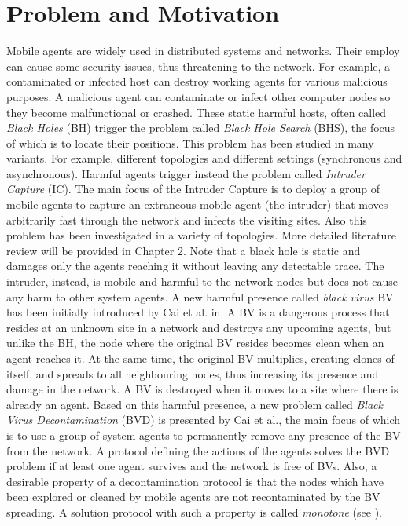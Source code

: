 \section{Problem and Motivation} 
Mobile agents are widely used in distributed systems and networks. Their employ can cause some security issues, thus threatening to the network. For example, a contaminated or infected host can destroy working agents for various malicious purposes. A malicious agent can contaminate or infect other computer nodes so they become malfunctional or crashed.
  These static  harmful hosts, often called {\em Black Holes} (BH) trigger the problem called {\em Black Hole Search} (BHS), the focus of which is to locate their positions. This problem has been studied in many variants. For example, different topologies and different settings (synchronous and asynchronous). 
  Harmful agents trigger instead the problem called {\em Intruder Capture} (IC). The main focus of the Intruder Capture  is to deploy a group of mobile agents to capture an extraneous mobile agent (the intruder) that moves arbitrarily fast through the network and infects the visiting sites. Also this problem  has been investigated in a variety of topologies. More detailed literature review will be provided in Chapter 2. Note that a black hole is static and   damages only  the agents reaching it without leaving any detectable trace. The intruder, instead,  is mobile and harmful to the network nodes but does not cause any harm to other system agents. 
    A new harmful presence called {\em black virus} BV has been initially introduced by Cai et al. in\cite{cai}. A BV is a dangerous process that resides at an unknown site in a network and destroys any upcoming agents, but unlike the BH, the node where the original BV resides   becomes clean when an agent reaches it. At the same time, the original BV multiplies, creating clones of itself, and spreads to all neighbouring nodes, thus increasing its presence and damage  in the network. A BV is destroyed when it moves to a site where there is already an agent. Based on this harmful presence, a new problem called {\em Black Virus Decontamination} (BVD) is presented by Cai et al., the main focus of which is to use a group of system agents to permanently remove any presence of the BV from the network. A protocol defining the actions of the agents solves the BVD problem if at least one agent survives and the network is free of BVs. Also, a desirable property of a  decontamination protocol is that the nodes which have been explored or cleaned by mobile agents are not   recontaminated by the BV spreading. A solution protocol with such a property is  called {\em monotone} (see \cite{monotone}).
